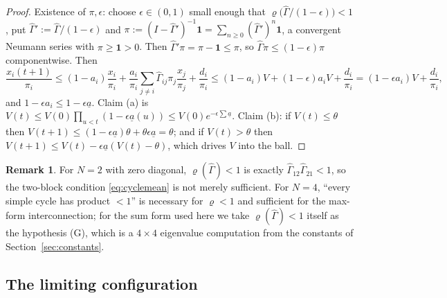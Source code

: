 \documentclass[11pt]{article}
\theoremstyle{definition}
\newtheorem{remark}{Remark}
\begin{document}
\begin{proof}
Existence of $\pi,\epsilon$: choose $\epsilon \in (0,1)$ small enough that
$\varrho\big(\hat\Gamma/(1-\epsilon)\big) < 1$, put
$\hat\Gamma' := \hat\Gamma/(1-\epsilon)$ and
$\pi := (I - \hat\Gamma')^{-1}\mathbf{1} = \sum_{n\ge0}(\hat\Gamma')^n\mathbf{1}$,
a convergent Neumann series with $\pi \ge \mathbf{1} > 0$. Then
$\hat\Gamma'\pi = \pi - \mathbf{1} \le \pi$, so
$\hat\Gamma\pi \le (1-\epsilon)\pi$ componentwise. Then
\[
  \frac{x_i(t+1)}{\pi_i}
  \le (1-a_i)\frac{x_i}{\pi_i}
    + \frac{a_i}{\pi_i}\sum_{j\ne i}\hat\Gamma_{ij}\pi_j\frac{x_j}{\pi_j}
    + \frac{d_i}{\pi_i}
  \le (1-a_i)V + (1-\epsilon)a_i V + \frac{d_i}{\pi_i}
  = (1-\epsilon a_i)V + \frac{d_i}{\pi_i},
\]
and $1 - \epsilon a_i \le 1 - \epsilon\underline a$. Claim (a) is
$V(t) \le V(0)\prod_{u<t}(1 - \epsilon\underline a(u)) \le
V(0)e^{-\epsilon\sum \underline a}$. Claim (b): if $V(t) \le \theta$ then
$V(t+1) \le (1-\epsilon\underline a)\theta + \theta\epsilon\underline a = \theta$;
and if $V(t) > \theta$ then $V(t+1) \le V(t) - \epsilon\underline a(V(t)-\theta)$,
which drives $V$ into the ball.
\end{proof}

\begin{remark}
For $N = 2$ with zero diagonal, $\varrho(\hat\Gamma) < 1$ is exactly
$\hat\Gamma_{12}\hat\Gamma_{21} < 1$, so the two-block condition
\eqref{eq:cyclemean} is not merely sufficient. For $N = 4$, ``every simple cycle
has product $< 1$'' is necessary for $\varrho < 1$ and sufficient for the
max-form interconnection; for the sum form used here we take
$\varrho(\hat\Gamma) < 1$ itself as the hypothesis (G), which is a $4\times4$
eigenvalue computation from the constants of Section~\ref{sec:constants}.
\end{remark}

\subsection{The limiting configuration}
\end{document}
